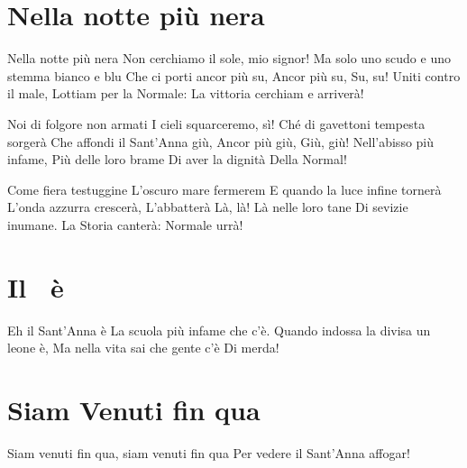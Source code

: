 \section{Nella notte più nera}
\subtitle{Sulla melodia di “Let's Go“ del Coro dell’Armata Rossa}
\begin{canzone}
Nella notte più nera
Non cerchiamo il sole, mio signor!
Ma solo uno scudo e uno stemma bianco e blu
Che ci porti ancor più su, 
Ancor più su,
Su, su!
Uniti contro il male,
Lottiam per la Normale:
La vittoria cerchiam e arriverà!

Noi di folgore non armati
I cieli squarceremo, sì!
Ché di gavettoni tempesta sorgerà
Che affondi il Sant’Anna giù, 
Ancor più giù, 
Giù, giù!
Nell’abisso più infame,
Più delle loro brame
Di aver la dignità
Della Normal!

Come fiera testuggine
L’oscuro mare fermerem
E quando la luce infine tornerà
L’onda azzurra crescerà,
L’abbatterà 
Là, là!
Là nelle loro tane
Di sevizie inumane.
La Storia canterà:
Normale urrà!
\end{canzone}

\section{Il \santanna\ è}
\begin{canzone}
Eh il Sant'Anna è
La scuola più infame che c’è.
Quando indossa la divisa un leone è,
Ma nella vita sai che gente c’è
Di merda!
\end{canzone}

\section{Siam Venuti fin qua}
\begin{canzone}
Siam venuti fin qua, siam venuti fin qua
Per vedere il Sant'Anna affogar!
\end{canzone}

